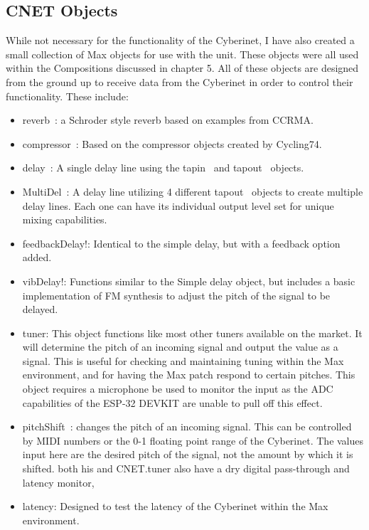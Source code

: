 \subsection{CNET Objects}

While not necessary for the functionality of the Cyberinet, I have also created a small collection of Max objects for use with the unit. These objects were all used within the Compositions discussed in chapter 5. All of these objects are designed from the ground up to receive data from the Cyberinet in order to control their functionality. These include:

\begin{itemize}
    \item reverb~: a Schroder style reverb based on examples from CCRMA.
    \item compressor~: Based on the compressor objects created by Cycling74.
    \item delay~: A single delay line using the tapin~ and tapout~ objects. 
    \item MultiDel~: A delay line utilizing 4 different tapout~ objects to create multiple delay lines. Each one can have its individual output level set for unique mixing capabilities.
    \item feedbackDelay!: Identical to the simple delay, but with a feedback option added.
    \item vibDelay!: Functions similar to the Simple delay object, but includes a basic implementation of FM synthesis to adjust the pitch of the signal to be delayed. 
    \item tuner: This object functions like most other tuners available on the market. It will determine the pitch of an incoming signal and output the value as a signal. This is useful for checking and maintaining tuning within the Max environment, and for having the Max patch respond to certain pitches. This object requires a microphone be used to monitor the input as the ADC capabilities of the ESP-32 DEVKIT are unable to pull off this effect.
    \item pitchShift~: changes the pitch of an incoming signal. This can be controlled by MIDI  numbers or the 0-1 floating point range of the Cyberinet. The values input here are the desired pitch of the signal, not the amount by which it is shifted. both his and CNET.tuner also have a dry digital pass-through and latency monitor,
    \item latency: Designed to test the latency of the Cyberinet within  the Max environment.
\end{itemize}


